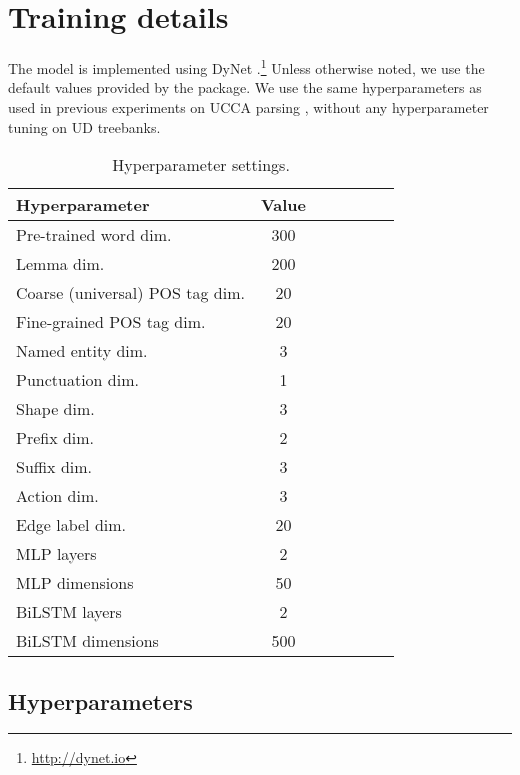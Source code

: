 \documentclass[11pt,a4paper]{article}
\begin{document}
\section{Training details}\label{sec:details}

The model is implemented using DyNet \cite{neubig2017dynet}.\footnote{\url{http://dynet.io}}
Unless otherwise noted, we use the default values provided by the package.
We use the same hyperparameters as used in previous experiments on UCCA
parsing \cite{hershcovich2018multitask},
without any hyperparameter tuning on UD treebanks.


\begin{table}[h]
\centering
\begin{tabular}{l|c|ccccc}
\hline
\bf Hyperparameter &  \bf Value \\
\hline
Pre-trained word dim. & 300 \\
Lemma dim. & 200 \\
Coarse (universal) POS tag dim. & 20 \\
Fine-grained POS tag dim. & 20 \\
Named entity dim. & 3 \\
Punctuation dim. & 1 \\
Shape dim. & 3 \\
Prefix dim. & 2 \\
Suffix dim. & 3 \\
Action dim. & 3 \\
Edge label dim. & 20 \\
\hline
MLP layers & 2 \\
MLP dimensions & 50 \\
BiLSTM layers & 2 & \\
BiLSTM dimensions & 500
\end{tabular}
\caption{Hyperparameter settings.\label{tab:hyperparams}}
\end{table}


\subsection{Hyperparameters}
\end{document}
